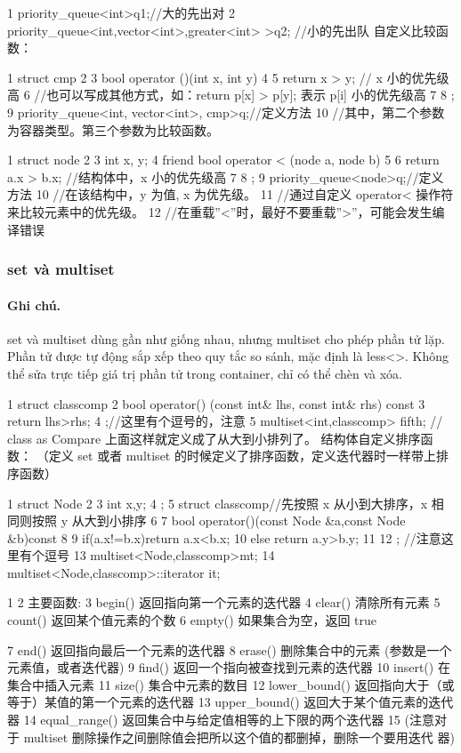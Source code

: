 \documentclass[11pt]{article}
\begin{document}
\begin{Code}
1 priority_queue<int>q1;//大的先出对
2 priority_queue<int,vector<int>,greater<int> >q2; //小的先出队
     自定义比较函数：

 1   struct cmp
 2   {
 3       bool operator ()(int x, int y)
 4       {
 5           return x > y; // x 小的优先级高
 6         //也可以写成其他方式，如：return p[x] > p[y]; 表示 p[i] 小的优先级高
 7   }
 8   };
 9   priority_queue<int, vector<int>, cmp>q;//定义方法
10   //其中，第二个参数为容器类型。第三个参数为比较函数。


 1   struct node
 2   {
 3       int x, y;
 4       friend bool operator < (node a, node b)
 5       {
 6           return a.x > b.x; //结构体中，x 小的优先级高
 7       }
 8   };
 9   priority_queue<node>q;//定义方法
10   //在该结构中，y 为值, x 为优先级。
11   //通过自定义 operator< 操作符来比较元素中的优先级。
12   //在重载”<”时，最好不要重载”>”，可能会发生编译错误
\end{Code}

\subsubsection{set và multiset}

\paragraph{Ghi chú.} set và multiset dùng gần như giống nhau, nhưng multiset cho phép phần tử lặp. Phần tử được tự động sắp xếp theo quy tắc so sánh, mặc định là less\textless{}\textgreater{}. Không thể sửa trực tiếp giá trị phần tử trong container, chỉ có thể chèn và xóa.

\begin{Code}
1 struct classcomp {
2   bool operator() (const int& lhs, const int& rhs) const
3   {return lhs>rhs;}
4 };//这里有个逗号的，注意
5 multiset<int,classcomp> fifth;                // class as Compare
     上面这样就定义成了从大到小排列了。
     结构体自定义排序函数：
     （定义 set 或者 multiset 的时候定义了排序函数，定义迭代器时一样带上排序函数）

 1   struct Node
 2   {
 3       int x,y;
 4   };
 5   struct classcomp//先按照 x 从小到大排序，x 相同则按照 y 从大到小排序
 6   {
 7       bool operator()(const Node &a,const Node &b)const
 8       {
 9           if(a.x!=b.x)return a.x<b.x;
10           else return a.y>b.y;
11       }
12   }; //注意这里有个逗号
13   multiset<Node,classcomp>mt;
14   multiset<Node,classcomp>::iterator it;

1
2    主要函数:
3    begin() 返回指向第一个元素的迭代器
4    clear() 清除所有元素
5    count() 返回某个值元素的个数
6    empty() 如果集合为空，返回 true


 7   end() 返回指向最后一个元素的迭代器
 8   erase() 删除集合中的元素 (参数是一个元素值，或者迭代器)
 9   find() 返回一个指向被查找到元素的迭代器
10   insert() 在集合中插入元素
11   size() 集合中元素的数目
12   lower_bound() 返回指向大于（或等于）某值的第一个元素的迭代器
13   upper_bound() 返回大于某个值元素的迭代器
14   equal_range() 返回集合中与给定值相等的上下限的两个迭代器
15   (注意对于 multiset 删除操作之间删除值会把所以这个值的都删掉，删除一个要用迭代
        器)
\end{Code}
\end{document}
